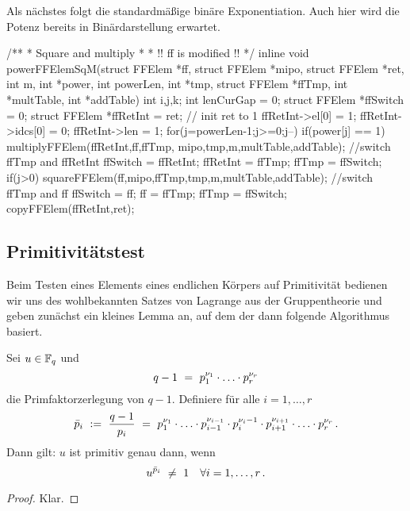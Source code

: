 Als nächstes folgt die standardmäßige binäre Exponentiation. Auch hier wird die
Potenz bereits in Binärdarstellung erwartet.

\begin{ccode}[caption={[\texttt{void powerFFElemSqM} aus 
 \url{../Sage/enumeratePCNs.c}]Aus \url{../Sage/enumeratePCNs.c}},
  label=lst:powerffelemsqm]
/**
 * Square and multiply
 *
 * !! ff is modified !!
 */
inline void powerFFElemSqM(struct FFElem *ff, struct FFElem *mipo,
        struct FFElem *ret, 
        int m, int *power, int powerLen,
        int *tmp, struct FFElem *ffTmp,
        int *multTable, int *addTable){
    int i,j,k;
    int lenCurGap = 0;
    struct FFElem *ffSwitch = 0;
    struct FFElem *ffRetInt = ret;
    // init ret to 1
    ffRetInt->el[0] = 1; ffRetInt->idcs[0] = 0; ffRetInt->len = 1;
    for(j=powerLen-1;j>=0;j--){
        if(power[j] == 1){
            multiplyFFElem(ffRetInt,ff,ffTmp, mipo,tmp,m,multTable,addTable);
            //switch ffTmp and ffRetInt
            ffSwitch = ffRetInt; ffRetInt = ffTmp; ffTmp = ffSwitch;
        }
        if(j>0){
            squareFFElem(ff,mipo,ffTmp,tmp,m,multTable,addTable);
            //switch ffTmp and ff
            ffSwitch = ff; ff = ffTmp; ffTmp = ffSwitch;
        }
    }
    copyFFElem(ffRetInt,ret);
}
\end{ccode}


\subsection{Primitivitätstest}
\label{subsub:primitivitaetstest}

Beim Testen eines Elements eines endlichen Körpers auf Primitivität bedienen
wir uns des wohlbekannten Satzes von Lagrange aus der Gruppentheorie und geben
zunächst ein kleines Lemma an, auf dem der dann folgende Algorithmus basiert.

\begin{lemma}
  Sei $u \in \mathbb{F}_q$ und
  \[ q-1 \ =\  p_1^{\nu_1}\cdot\ldots\cdot p_r^{\nu_r}\]
  die Primfaktorzerlegung von $q-1$. Definiere
  für alle $i=1,\dots,r$
  \[ \bar p_i \ :=\   \frac{q-1}{p_i} \ =\ 
    p_1^{\nu_1}\cdot \ldots\cdot p_{i-1}^{\nu_{i-1}} \cdot
    p_i^{\nu_i-1}\cdot p_{i+1}^{\nu_{i+1}}\cdot\ldots\cdot p_r^{\nu_r}\,.\]
  Dann gilt: $u$ ist primitiv genau dann, wenn
  \[ u^{\bar p_i} \ \neq\  1\quad\forall i=1,\ldots,r \,.\]
\end{lemma}
\begin{proof}
  Klar.
\end{proof}

